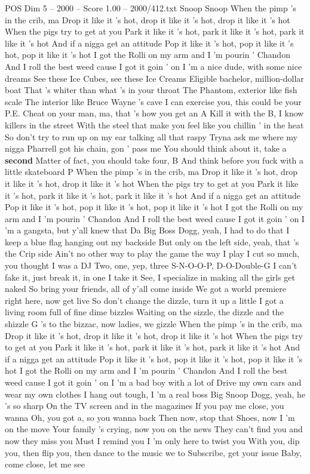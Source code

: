 \begin{textsample}{POS Dim 5 – 2000 – Score 1.00 – 2000/412.txt}  \label{ex:f5_pos_018}
Snoop Snoop When the pimp 's in the crib, ma Drop it like it 's hot, drop it like it 's hot, drop it like it 's hot When the pigs try to get at you Park it like it 's hot, park it like it 's hot, park it like it 's hot And if a nigga get an attitude Pop it like it 's hot, pop it like it 's hot, pop it like it 's hot I got the Rolli on my arm and I 'm pourin ' Chandon And I roll the best weed cause I got it goin ' on I 'm a nice dude, with some nice dreams See these Ice Cubes, see these Ice Creams Eligible bachelor, million-dollar boat That 's whiter than what 's in your throat The Phantom, exterior like fish scale The interior like Bruce Wayne 's cave I can exercise you, this could be your P.E.
Cheat on your man, ma, that 's how you get an A Kill it with the B, I know killers in the street With the steel that make you feel like you chillin ' in the heat So don't try to run up on my ear talking all that raspy Tryna ask me where my nigga Pharrell got his chain, gon ' pass me You should think about it, take a \textbf{second} Matter of fact, you should take four, B And think before you fuck with a little skateboard P When the pimp 's in the crib, ma Drop it like it 's hot, drop it like it 's hot, drop it like it 's hot When the pigs try to get at you Park it like it 's hot, park it like it 's hot, park it like it 's hot And if a nigga get an attitude Pop it like it 's hot, pop it like it 's hot, pop it like it 's hot I got the Rolli on my arm and I 'm pourin ' Chandon And I roll the best weed cause I got it goin ' on I 'm a gangsta, but y'all knew that Da Big Boss Dogg, yeah, I had to do that I keep a blue flag hanging out my backside But only on the left side, yeah, that 's the Crip side Ain't no other way to play the game the way I play I cut so much, you thought I was a DJ Two, one, yep, three S-N-O-O-P, D-O-Double-G I can't fake it, just break it, in one I take it See, I specialize in making all the girls get naked So bring your friends, all of y'all come inside We got a world premiere right here, now get live So don't change the dizzle, turn it up a little I got a living room full of fine dime bizzles Waiting on the sizzle, the dizzle and the shizzle G 's to the bizzac, now ladies, we gizzle When the pimp 's in the crib, ma Drop it like it 's hot, drop it like it 's hot, drop it like it 's hot When the pigs try to get at you Park it like it 's hot, park it like it 's hot, park it like it 's hot And if a nigga get an attitude Pop it like it 's hot, pop it like it 's hot, pop it like it 's hot I got the Rolli on my arm and I 'm pourin ' Chandon And I roll the best weed cause I got it goin ' on I 'm a bad boy with a lot of Drive my own cars and wear my own clothes I hang out tough, I 'm a real boss Big Snoop Dogg, yeah, he 's so sharp On the TV screen and in the magazines If you pay me close, you wanna Oh, you got a, so you wanna back Then now, stop that Shoes, now I 'm on the move Your family 's crying, now you on the news They can't find you and now they miss you Must I remind you I 'm only here to twist you With you, dip you, then flip you, then dance to the music we to Subscribe, get your issue Baby, come close, let me see 
\end{textsample}
